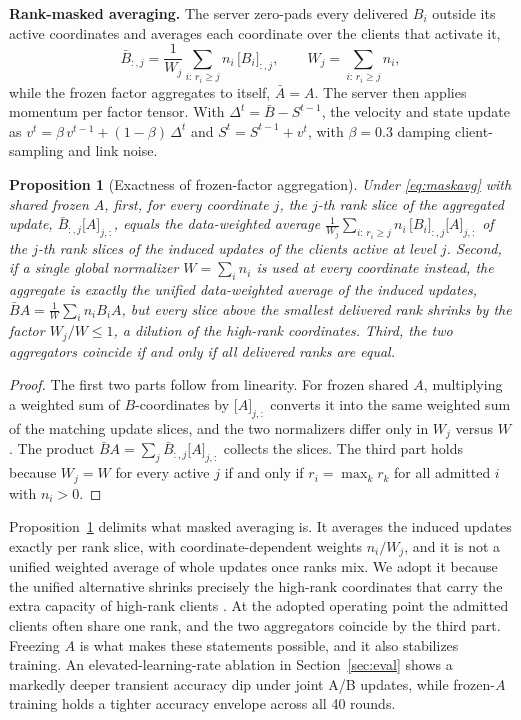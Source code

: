 \documentclass[preprint,12pt]{elsarticle}
\newtheorem{proposition}{Proposition}
\begin{document}
\textbf{Rank-masked averaging.} The server zero-pads every delivered $B_i$ outside its active coordinates and averages each coordinate over the clients that activate it,
\begin{equation}
\bar B_{:,j}=\frac{1}{W_j}\sum_{i:\,r_i\ge j} n_i\,\big[B_i\big]_{:,j},
\qquad
W_j=\sum_{i:\,r_i\ge j} n_i ,
\label{eq:maskavg}
\end{equation}
while the frozen factor aggregates to itself, $\bar A=A$. The server then applies momentum per factor tensor. With $\Delta^t=\bar B-S^{t-1}$, the velocity and state update as $v^t=\beta\,v^{t-1}+(1-\beta)\,\Delta^t$ and $S^t=S^{t-1}+v^t$, with $\beta=0.3$ damping client-sampling and link noise.

\begin{proposition}[Exactness of frozen-factor aggregation]
\label{prop:agg}
Under \eqref{eq:maskavg} with shared frozen $A$, first, for every coordinate $j$, the $j$-th rank slice of the aggregated update, $\bar B_{:,j}\big[A\big]_{j,:}$, equals the data-weighted average $\frac{1}{W_j}\sum_{i:\,r_i\ge j} n_i\,\big[B_i\big]_{:,j}\big[A\big]_{j,:}$ of the $j$-th rank slices of the induced updates of the clients active at level $j$.
Second, if a single global normalizer $W=\sum_i n_i$ is used at every coordinate instead, the aggregate is exactly the unified data-weighted average of the induced updates, $\bar BA=\frac{1}{W}\sum_i n_i B_iA$, but every slice above the smallest delivered rank shrinks by the factor $W_j/W\le 1$, a dilution of the high-rank coordinates. Third, the two aggregators coincide if and only if all delivered ranks are equal.
\end{proposition}
\begin{proof}
The first two parts follow from linearity. For frozen shared $A$, multiplying a weighted sum of $B$-coordinates by $\big[A\big]_{j,:}$ converts it into the same weighted sum of the matching update slices, and the two normalizers differ only in $W_j$ versus $W$. The product $\bar BA=\sum_j\bar B_{:,j}\big[A\big]_{j,:}$ collects the slices. The third part holds because $W_j=W$ for every active $j$ if and only if $r_i=\max_k r_k$ for all admitted $i$ with $n_i>0$.
\end{proof}

Proposition~\ref{prop:agg} delimits what masked averaging is. It averages the induced updates exactly per rank slice, with coordinate-dependent weights $n_i/W_j$, and it is not a unified weighted average of whole updates once ranks mix. We adopt it because the unified alternative shrinks precisely the high-rank coordinates that carry the extra capacity of high-rank clients \cite{wang2024flora,babakniya2023slora}. At the adopted operating point the admitted clients often share one rank, and the two aggregators coincide by the third part. Freezing $A$ is what makes these statements possible, and it also stabilizes training. An elevated-learning-rate ablation in Section~\ref{sec:eval} shows a markedly deeper transient accuracy dip under joint A/B updates, while frozen-$A$ training holds a tighter accuracy envelope across all 40 rounds.
\end{document}
